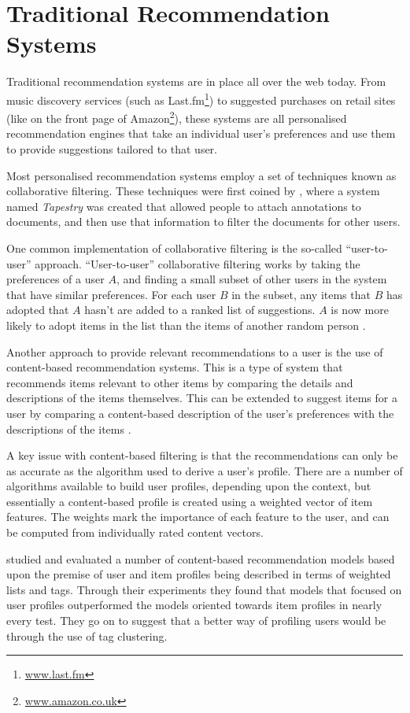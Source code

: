 \documentclass[11pt,a4paper]{report}
\begin{document}
\section{Traditional Recommendation Systems}
Traditional recommendation systems are in place all over the web today. From music discovery services (such as Last.fm\footnote{\url{www.last.fm}}) to suggested purchases on retail sites (like on the front page of Amazon\footnote{\url{www.amazon.co.uk}}), these systems are all personalised recommendation engines that take an individual user's preferences and use them to provide suggestions tailored to that user.

Most personalised recommendation systems employ a set of techniques known as collaborative filtering. These techniques were first coined by \textcite{Goldberg:1992}, where a system named \emph{Tapestry} was created that allowed people to attach annotations to documents, and then use that information to filter the documents for other users.

One common implementation of collaborative filtering is the so-called ``user-to-user'' approach. ``User-to-user'' collaborative filtering works by taking the preferences of a user $A$, and finding a small subset of other users in the system that have similar preferences. For each user $B$ in the subset, any items that $B$ has adopted that $A$ hasn't are added to a ranked list of suggestions. $A$ is now more likely to adopt items in the list than the items of another random person \parencite{Schafer:2001}.

Another approach to provide relevant recommendations to a user is the use of content-based recommendation systems. This is a type of system that recommends items relevant to other items by comparing the details and descriptions of the items themselves. This can be extended to suggest items for a user by comparing a content-based description of the user's preferences with the descriptions of the items \parencite{Pazzani:2007}.

A key issue with content-based filtering is that the recommendations can only be as accurate as the algorithm used to derive a user's profile. There are a number of algorithms available to build user profiles, depending upon the context, but essentially a content-based profile is created using a weighted vector of item features. The weights mark the importance of each feature to the user, and can be computed from individually rated content vectors.

\textcite{Cantador:2010} studied and evaluated a number of content-based recommendation models based upon the premise of user and item profiles being described in terms of weighted lists and tags. Through their experiments they found that models that focused on user profiles outperformed the models oriented towards item profiles in nearly every test. They go on to suggest that a better way of profiling users would be through the use of tag clustering.
\end{document}
